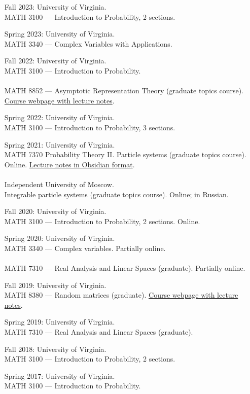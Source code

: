 \documentclass[letterpaper,11pt]{article}
\begin{document}
\begin{itemize}
	\item[Fall 2023:]
	University of Virginia.
	\\ MATH 3100 --- Introduction to
	Probability, 2 sections.

	\item[Spring 2023:]
	University of Virginia. \\ MATH 3340 --- Complex Variables with Applications.

	\item[Fall 2022:]
	University of Virginia.
	\\ MATH 3100 --- Introduction to
	Probability.
	\\\\
	MATH 8852 --- Asymptotic Representation Theory (graduate topics course).
	\href{https://lpetrov.cc/art2022/}{Course webpage with lecture notes}.

	\item[Spring 2022:]
	University of Virginia. \\ MATH 3100 --- Introduction to
	Probability, 3 sections.
	\item
	[Spring 2021:]
	University of Virginia.
	\\
	MATH 7370 Probability Theory II. Particle systems (graduate topics course). Online.
	\href{https://github.com/lenis2000/HTML_ParticleSysS21}{Lecture notes in Obsidian format}.
	\\\\
	Independent University of Moscow.
	\\
	Integrable particle systems (graduate topics course). Online; in Russian.

\item[Fall 2020:]
	University of Virginia. \\ MATH 3100 --- Introduction to
	Probability, 2 sections. Online.
	\item
				[Spring 2020:]
				University of Virginia.
				\\
				MATH 3340 --- Complex variables. Partially online.
				\\\\
				MATH 7310 --- Real Analysis and Linear Spaces (graduate). Partially online.
	\item
				[Fall 2019:]
				University of Virginia. \\ MATH 8380 --- Random matrices (graduate).
				\href{https://lpetrov.cc/rmt19/}{Course webpage with lecture notes}.
	\item
				[Spring 2019:]
				University of Virginia. \\ MATH 7310 --- Real Analysis and Linear Spaces (graduate).
	\item
	      [Fall 2018:]
	      University of Virginia. \\ MATH 3100 --- Introduction to
				Probability, 2 sections.
	\item
	      [Spring 2017:]
	      University of Virginia. \\ MATH 3100 --- Introduction to
	      Probability.


\end{itemize}
\end{document}
